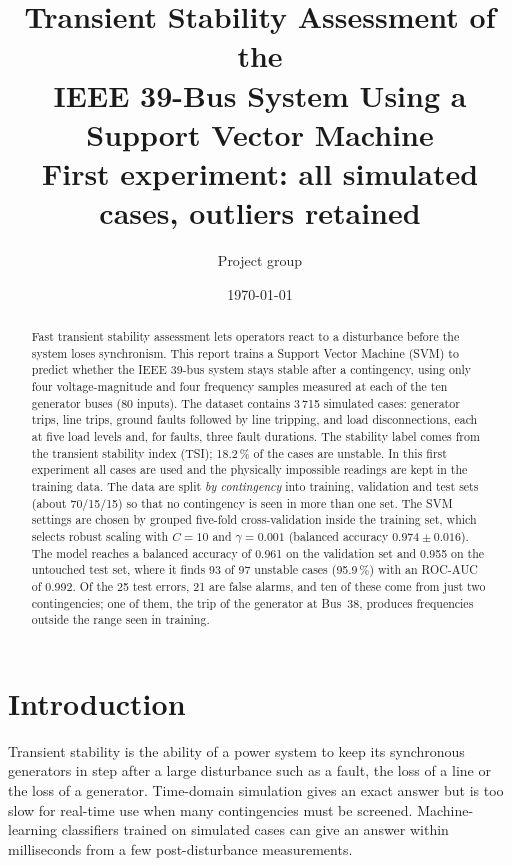 \documentclass[11pt,a4paper]{article}
\title{\textbf{Transient Stability Assessment of the\\IEEE 39-Bus System Using a Support Vector Machine}\\[0.4em]
\large First experiment: all simulated cases, outliers retained}
\author{Project group} %
\date{\today}
\begin{document}
\maketitle

\begin{abstract}
\noindent
Fast transient stability assessment lets operators react to a disturbance before the system loses synchronism.
This report trains a Support Vector Machine (SVM) to predict whether the IEEE 39-bus system stays stable after a
contingency, using only four voltage-magnitude and four frequency samples measured at each of the ten generator buses
(80 inputs). The dataset contains 3\,715 simulated cases: generator trips, line trips, ground faults followed by line
tripping, and load disconnections, each at five load levels and, for faults, three fault durations. The stability
label comes from the transient stability index (TSI); 18.2\,\% of the cases are unstable.
In this first experiment all cases are used and the physically impossible readings are kept in the training data.
The data are split \emph{by contingency} into training, validation and test sets (about 70/15/15) so that no
contingency is seen in more than one set. The SVM settings are chosen by grouped five-fold cross-validation inside
the training set, which selects robust scaling with $C = 10$ and $\gamma = 0.001$ (balanced accuracy
$0.974 \pm 0.016$). The model reaches a balanced accuracy of 0.961 on the validation set and 0.955 on the untouched
test set, where it finds 93 of 97 unstable cases (95.9\,\%) with an ROC-AUC of 0.992. Of the 25 test errors, 21 are false
alarms, and ten of these come from just two contingencies; one of them, the trip of the generator at Bus~38, produces
frequencies outside the range seen in training.
\end{abstract}

\tableofcontents
\newpage

\section{Introduction}
Transient stability is the ability of a power system to keep its synchronous generators in step after a large
disturbance such as a fault, the loss of a line or the loss of a generator. Time-domain simulation gives an exact
answer but is too slow for real-time use when many contingencies must be screened. Machine-learning classifiers
trained on simulated cases can give an answer within milliseconds from a few post-disturbance measurements.
\end{document}
